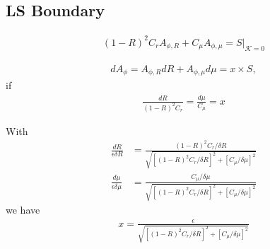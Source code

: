 \documentclass[aps,prd,preprint,groupedaddress]{revtex4-1}
\def\nn{\nonumber}
\def\beq{\begin{equation}}
\def\beqn{\begin{eqnarray}}
\def\eeq{\end{equation}}
\def\eeqn{\end{eqnarray}}
\def\A{A_\phi}
\def\Ar{A_{\phi,r}}
\def\Am{A_{\phi,\mu}}
\def\AR{A_{\phi,R}}
\begin{document}
\subsection{LS Boundary}
\begin{align}
    (1-R)^2 C_r \AR + C_\mu \Am = S |_{\mathcal K = 0}
\end{align}

\begin{align}
d\A = \AR dR + \Am d\mu = x \times S,
\end{align}
if
\beqn
 \frac{dR}{(1-R)^2 C_r} = \frac{d\mu}{C_\mu} = x
\eeqn

%
With
\begin{align}
    \frac{dR}{\epsilon \delta R}
    &= \frac{(1-R)^2 C_r/\delta R }{\sqrt{[(1-R)^2C_r/\delta R]^2
    + [C_\mu /\delta \mu]^2}} \nn \\
    \frac{d\mu}{\epsilon \delta \mu}
    &= \frac{C_\mu/\delta \mu}{\sqrt{[(1-R)^2C_r/\delta R]^2
    + [C_\mu /\delta \mu]^2}}
\end{align}
we have
\beqn
x = \frac{\epsilon}{\sqrt{[(1-R)^2C_r/\delta R]^2
+ [C_\mu /\delta \mu]^2}}
\eeqn
\end{document}
